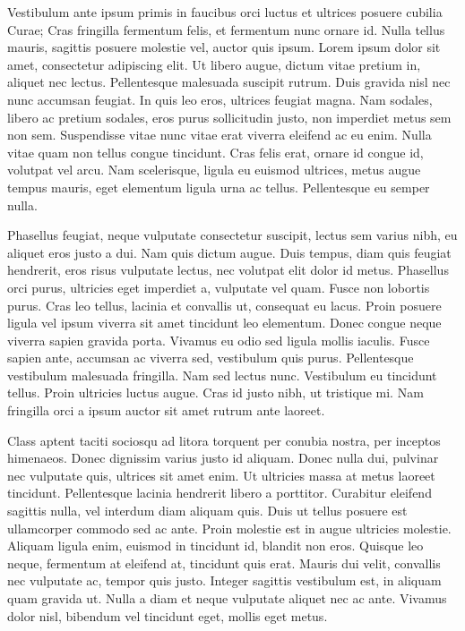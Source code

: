 \documentclass{EPUProjetDi}
\begin{document}
Vestibulum ante ipsum primis in faucibus orci luctus et ultrices posuere cubilia Curae; Cras fringilla fermentum felis, et fermentum nunc ornare id. Nulla tellus mauris, sagittis posuere molestie vel, auctor quis ipsum. Lorem ipsum dolor sit amet, consectetur adipiscing elit. Ut libero augue, dictum vitae pretium in, aliquet nec lectus. Pellentesque malesuada suscipit rutrum. Duis gravida nisl nec nunc accumsan feugiat. In quis leo eros, ultrices feugiat magna. Nam sodales, libero ac pretium sodales, eros purus sollicitudin justo, non imperdiet metus sem non sem. Suspendisse vitae nunc vitae erat viverra eleifend ac eu enim. Nulla vitae quam non tellus congue tincidunt. Cras felis erat, ornare id congue id, volutpat vel arcu. Nam scelerisque, ligula eu euismod ultrices, metus augue tempus mauris, eget elementum ligula urna ac tellus. Pellentesque eu semper nulla.

Phasellus feugiat, neque vulputate consectetur suscipit, lectus sem varius nibh, eu aliquet eros justo a dui. Nam quis dictum augue. Duis tempus, diam quis feugiat hendrerit, eros risus vulputate lectus, nec volutpat elit dolor id metus. Phasellus orci purus, ultricies eget imperdiet a, vulputate vel quam. Fusce non lobortis purus. Cras leo tellus, lacinia et convallis ut, consequat eu lacus. Proin posuere ligula vel ipsum viverra sit amet tincidunt leo elementum. Donec congue neque viverra sapien gravida porta. Vivamus eu odio sed ligula mollis iaculis. Fusce sapien ante, accumsan ac viverra sed, vestibulum quis purus. Pellentesque vestibulum malesuada fringilla. Nam sed lectus nunc. Vestibulum eu tincidunt tellus. Proin ultricies luctus augue. Cras id justo nibh, ut tristique mi. Nam fringilla orci a ipsum auctor sit amet rutrum ante laoreet.

Class aptent taciti sociosqu ad litora torquent per conubia nostra, per inceptos himenaeos. Donec dignissim varius justo id aliquam. Donec nulla dui, pulvinar nec vulputate quis, ultrices sit amet enim. Ut ultricies massa at metus laoreet tincidunt. Pellentesque lacinia hendrerit libero a porttitor. Curabitur eleifend sagittis nulla, vel interdum diam aliquam quis. Duis ut tellus posuere est ullamcorper commodo sed ac ante. Proin molestie est in augue ultricies molestie. Aliquam ligula enim, euismod in tincidunt id, blandit non eros. Quisque leo neque, fermentum at eleifend at, tincidunt quis erat. Mauris dui velit, convallis nec vulputate ac, tempor quis justo. Integer sagittis vestibulum est, in aliquam quam gravida ut. Nulla a diam et neque vulputate aliquet nec ac ante. Vivamus dolor nisl, bibendum vel tincidunt eget, mollis eget metus.
\end{document}
